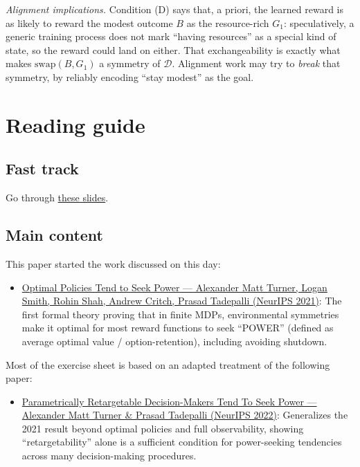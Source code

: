 \documentclass[11pt]{article}
\newcommand{\Dist}{\mathcal{D}}    %
\begin{document}
\emph{Alignment implications.} Condition (D) says that, a priori, the learned reward is as likely
to reward the modest outcome $B$ as the resource-rich $G_1$: speculatively, a generic training process does not
mark ``having resources'' as a special kind of state, so the reward could land on either.
That exchangeability is exactly what makes $\mathrm{swap}(B,G_1)$ a symmetry of $\Dist$. Alignment work may try to \emph{break} that symmetry, by reliably encoding ``stay
modest'' as the goal.

\section*{Reading guide}

\subsection*{Fast track}

Go through \href{https://drive.google.com/drive/folders/127bVYqhJPhzA7S71FwTqeyNKKKkjM2NB}{these slides}.

\subsection*{Main content}

This paper started the work discussed on this day:

\begin{itemize}
  \item \href{https://arxiv.org/abs/1912.01683}{Optimal Policies Tend to Seek Power --- Alexander Matt Turner, Logan Smith, Rohin Shah, Andrew Critch, Prasad Tadepalli (NeurIPS 2021)}: The first formal theory proving that in finite MDPs, environmental symmetries make it optimal for most reward functions to seek ``POWER'' (defined as average optimal value / option-retention), including avoiding shutdown.
\end{itemize}

Most of the exercise sheet is based on an adapted treatment of the following paper:

\begin{itemize}
  \item \href{https://arxiv.org/abs/2206.13477}{Parametrically Retargetable Decision-Makers Tend To Seek Power --- Alexander Matt Turner \& Prasad Tadepalli (NeurIPS 2022)}: Generalizes the 2021 result beyond optimal policies and full observability, showing ``retargetability'' alone is a sufficient condition for power-seeking tendencies across many decision-making procedures.
\end{itemize}
\end{document}
